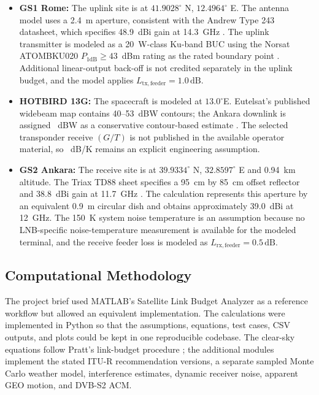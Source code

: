 \begin{itemize}
    \item \textbf{GS1 Rome:} The uplink site is at $41.9028^\circ$ N, $12.4964^\circ$ E. The antenna model uses a 2.4~m aperture, consistent with the Andrew Type 243 datasheet, which specifies 48.9~dBi gain at 14.3~GHz \cite{skyware_24m}. The uplink transmitter is modeled as a 20~W-class Ku-band BUC using the Norsat ATOMBKU020 $P_{1\mathrm{dB}}\ge43$~dBm rating as the rated boundary point \cite{norsat_atombku}. Additional linear-output back-off is not credited separately in the uplink budget, and the model applies $L_{\mathrm{tx,feeder}}=1.0\,\mathrm{dB}$.
    \item \textbf{HOTBIRD 13G:} The spacecraft is modeled at $13.0^\circ$E. Eutelsat's published widebeam map contains 40--53~dBW contours; the Ankara downlink is assigned \satEIRP~dBW as a conservative contour-based estimate \cite{eutelsat}. The selected transponder receive $(G/T)$ is not published in the available operator material, so \satGT~dB/K remains an explicit engineering assumption.
    \item \textbf{GS2 Ankara:} The receive site is at $39.9334^\circ$ N, $32.8597^\circ$ E and 0.94~km altitude. The Triax TD88 sheet specifies a 95~cm by 85~cm offset reflector and 38.8~dBi gain at 11.7~GHz \cite{triax_td88}. The calculation represents this aperture by an equivalent 0.9~m circular dish and obtains approximately 39.0~dBi at 12~GHz. The 150~K system noise temperature is an assumption because no LNB-specific noise-temperature measurement is available for the modeled terminal, and the receive feeder loss is modeled as $L_{\mathrm{rx,feeder}}=0.5\,\mathrm{dB}$.
\end{itemize}

\subsection{Computational Methodology}
The project brief used MATLAB's Satellite Link Budget Analyzer as a reference workflow but allowed an equivalent implementation. The calculations were implemented in Python so that the assumptions, equations, test cases, CSV outputs, and plots could be kept in one reproducible codebase. The clear-sky equations follow Pratt's link-budget procedure \cite{pratt}; the additional modules implement the stated ITU-R recommendation versions, a separate sampled Monte Carlo weather model, interference estimates, dynamic receiver noise, apparent GEO motion, and DVB-S2 ACM.

